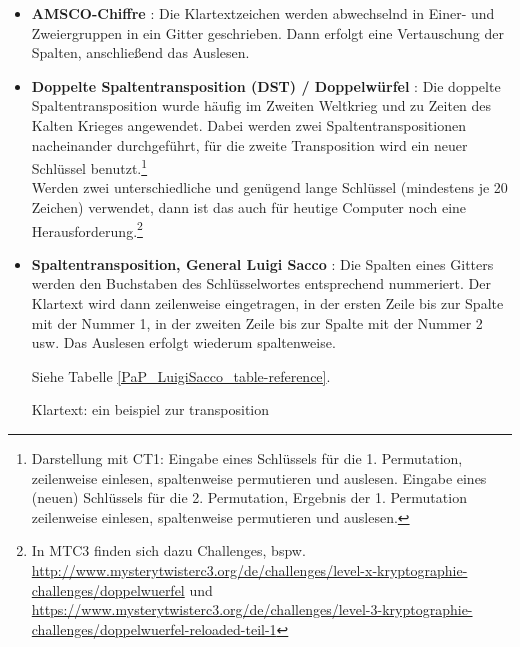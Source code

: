 \begin{refsegment}
\begin{itemize}
   Transpositionsschlüssel: K=2; E=1; Y=3. \\
   Geheimtext: IEPLR APIOE BSEUR SSINI IZTNO TN \\


\item \textbf{AMSCO-Chiffre} \cite{ACA2002}: Die Klartextzeichen
   werden abwechselnd in Einer- und Zweiergruppen in ein Gitter geschrieben.
   Dann erfolgt eine Vertauschung der Spalten, anschließend das Auslesen.


\item \textbf{Doppelte Spaltentransposition (DST) / \glqq Doppelwürfel\grqq}
   \cite{Savard1999}:
   Die doppelte
   Spaltentransposition wurde häufig im Zweiten Weltkrieg und zu Zeiten des
   Kalten Krieges angewendet. Dabei werden zwei Spaltentranspositionen
   nacheinander durchgeführt, für die zweite Transposition wird ein neuer
   Schlüssel benutzt.\footnote{%
   Darstellung mit CT1: Eingabe eines Schlüssels für die 1. Permutation,
   zeilenweise einlesen, spaltenweise permutieren und auslesen.
   Eingabe eines (neuen) Schlüssels für die 2. Permutation, Ergebnis der
   1. Permutation zeilenweise einlesen, spaltenweise permutieren und
   auslesen.
   }\\
   Werden zwei unterschiedliche und genügend lange Schlüssel (mindestens je 20
   Zeichen) verwendet, dann ist das auch für heutige Computer noch eine
   Herausforderung.\footnote{%
     In MTC3 finden sich dazu Challenges, bspw.\\
     \url{http://www.mysterytwisterc3.org/de/challenges/level-x-kryptographie-challenges/doppelwuerfel} und\\
     \url{https://www.mysterytwisterc3.org/de/challenges/level-3-kryptographie-challenges/doppelwuerfel-reloaded-teil-1}
   }


\item \textbf{Spaltentransposition, General Luigi Sacco} \cite{Savard1999}: Die
   Spalten eines Gitters werden den Buchstaben des Schlüsselwortes
   entsprechend nummeriert. Der Klartext wird dann zeilenweise eingetragen,
   in der ersten Zeile bis zur Spalte mit der Nummer 1, in der zweiten Zeile
   bis zur Spalte mit der Nummer 2 usw. Das Auslesen erfolgt wiederum
   spaltenweise.

   Siehe Tabelle \ref{PaP_LuigiSacco_table-reference}.

   Klartext: ein beispiel zur transposition


\end{itemize}
\end{refsegment}
